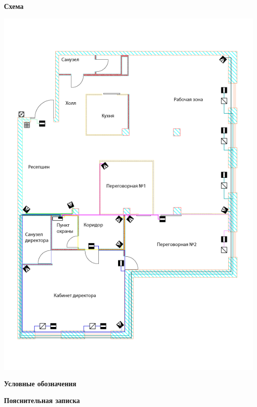 \documentclass[a4paper,14pt]{extarticle}
\begin{document}
    \begin{center}
        \textbf{Схема}
    \end{center}
    \vspace{-6ex}
    \begin{center}
        \includegraphics[scale=0.65, angle=90]{pics/Sensors.png}
    \end{center}
    \textbf{Условные обозначения}
    \begin{center}
        
    \end{center}
    \textbf{Пояснительная записка}
\end{document}
